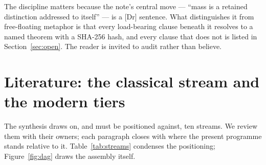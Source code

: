 \documentclass[10pt,twocolumn]{article}
\theoremstyle{definition}
\newcommand{\Dr}{\textsf{[Dr]}}
\begin{document}
The discipline matters because the note's central move --- ``mass is a retained
distinction addressed to itself'' --- is a \Dr{} sentence. What distinguishes it from
free-floating metaphor is that every load-bearing clause beneath it resolves to a named
theorem with a SHA-256 hash, and every clause that does not is listed in
Section~\ref{sec:open}. The reader is invited to audit rather than believe.

\section{Literature: the classical stream and the modern tiers}\label{sec:lit}

The synthesis draws on, and must be positioned against, ten streams. We review
them with their owners; each paragraph closes with where the present programme
stands relative to it. Table~\ref{tab:streams} condenses the positioning;
Figure~\ref{fig:dag} draws the assembly itself.
\end{document}
